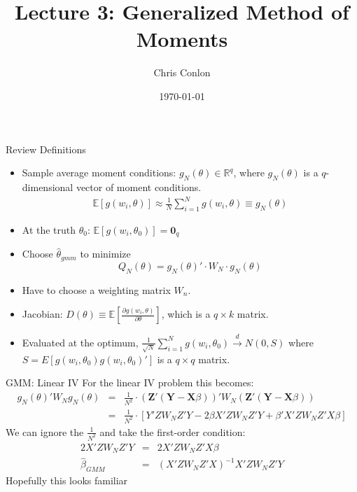 \documentclass[aspectratio=169]{beamer}
\title{Lecture 3: Generalized Method of Moments}
\author{Chris Conlon }
\institute{NYU Stern }
\date{\today}
\begin{document}
\maketitle


 

\begin{frame}{Review Definitions}

\begin{itemize}
\item Sample average moment conditions: $g_N(\theta) \in \mathbb{R}^q$, where $g_N(\theta)$ is a $q$-dimensional vector of moment conditions.
\begin{eqnarray*}
\mathbb{E}[g(w_i, \theta )] \approx \frac{1}{N} \sum_{i=1}^N g(w_i, \theta)  \equiv g_N(\theta)
\end{eqnarray*}
\item At the truth $\theta_0$: $\mathbb{E}[g(w_i, \theta_0 )] =\mathbf{0}_q$
\item Choose $\widehat{\theta}_{gmm}$ to minimize $$Q_N(\theta)=g_N(\theta)' \cdot W_N \cdot  g_N(\theta)$$
\item Have to choose a weighting matrix $W_n$.
\item Jacobian: $D(\theta) \equiv \mathbb{E}[\frac{\partial g(w_i,\theta)}{\partial \theta}]$, which is a $q \times k$ matrix.
\item  Evaluated at the optimum, $\frac{1}{\sqrt{N}} \sum_{i=1}^N g(w_i,\theta_0) \overset{d}{\to} N(0,S)$ where $S = E[g(w_i,\theta_0) g(w_i,\theta_0)']$ is a $q \times q$ matrix.
\end{itemize}
\end{frame}


\begin{frame}{GMM: Linear IV}
For the linear IV problem this becomes:
\begin{eqnarray*}
g_N(\theta)' W_N  g_N(\theta) &=& \frac{1}{N^2} \cdot (\mathbf{Z}' (\mathbf{Y} - \mathbf{X} \beta))' W_N (\mathbf{Z}' (\mathbf{Y} - \mathbf{X} \beta)) \\
&=& \frac{1}{N^2}\cdot [Y'Z W_N Z' Y - 2 \beta X' Z W_N Z' Y + \beta' X' Z W_N Z' X \beta]
\end{eqnarray*}
We can ignore the $\frac{1}{N^2}$ and take the first-order condition:
\begin{eqnarray*}
2 X'Z W_N Z' Y &=& 2 X'Z W_N Z' X \beta\\
\hat{\beta}_{GMM} &=& (X'Z W_N Z' X)^{-1} X' Z W_N Z'Y
\end{eqnarray*}
\alert{Hopefully this looks familiar}
\end{frame}
\end{document}
